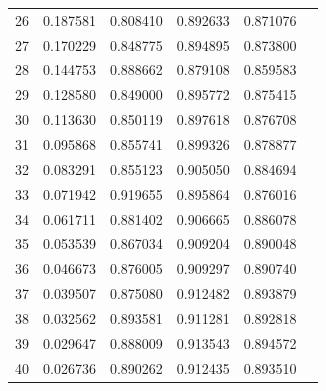 \begin{table}[ht]
{\begin{tabular}{c c c c c c}
26 & 0.187581 & 0.808410 & 0.892633 & 0.871076 \\
27 & 0.170229 & 0.848775 & 0.894895 & 0.873800 \\
28 & 0.144753 & 0.888662 & 0.879108 & 0.859583 \\
29 & 0.128580 & 0.849000 & 0.895772 & 0.875415 \\
30 & 0.113630 & 0.850119 & 0.897618 & 0.876708 \\
31 & 0.095868 & 0.855741 & 0.899326 & 0.878877 \\
32 & 0.083291 & 0.855123 & 0.905050 & 0.884694 \\
33 & 0.071942 & 0.919655 & 0.895864 & 0.876016 \\
34 & 0.061711 & 0.881402 & 0.906665 & 0.886078 \\
35 & 0.053539 & 0.867034 & 0.909204 & 0.890048 \\
36 & 0.046673 & 0.876005 & 0.909297 & 0.890740 \\
37 & 0.039507 & 0.875080 & 0.912482 & 0.893879 \\
38 & 0.032562 & 0.893581 & 0.911281 & 0.892818 \\
39 & 0.029647 & 0.888009 & 0.913543 & 0.894572 \\
40 & 0.026736 & 0.890262 & 0.912435 & 0.893510 \\
\hline
\end{tabular}
}
\end{table}


